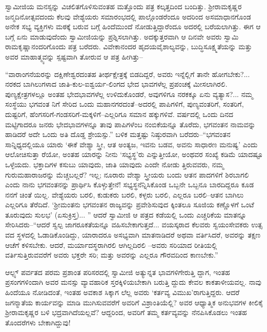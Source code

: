 ಸ್ವಾಮೀಜಿಯ ಮನಸ್ಸನ್ನು ವಿಚಲಿತಗೊಳಿಸುವಂತಹ ಮತ್ತೊಂದು ಪತ್ರ ಕಲ್ಕತ್ತದಿಂದ ಬಂದಿತ್ತು. ಶ್ರೀರಾಮಕೃಷ್ಣರ ಜನ್ಮದಿನೋತ್ಸವದಂದು ಕೆಲವು ವೇಶ್ಯೆಯರು ಸಮಾರಂಭದಲ್ಲಿ ಪಾಲ್ಗೊಂಡರೆಂದೂ ಅದರಿಂದ ಅಸಮಾಧಾನಗೊಂಡ ಅನೇಕ ಸಭ್ಯ ವ್ಯಕ್ತಿಗಳು ಮಠಕ್ಕೆ ಬರುವ ಬಗ್ಗೆ ಹಿಂದೆಮುಂದೆ ನೋಡುತ್ತಿದ್ದಾರೆಂದೂ ಅದರಲ್ಲಿ ಬರೆಯಲಾಗಿತ್ತು. ಈಗ ಆ ಬಗ್ಗೆ ಏನು ಮಾಡುವುದೆಂದು ಸ್ವಾಮೀಜಿಯನ್ನು ಪ್ರಶ್ನಿಸಲಾಗಿತ್ತು. ಅದಕ್ಕುತ್ತರವಾಗಿ ಆ ದಿನವೇ ಅವರು ಸ್ವಾಮಿ ರಾಮಕೃಷ್ಣಾನಂದರಿಗೊಂದು ಪತ್ರ ಬರೆದರು. ವಿವೇಕಾನಂದರ ಹೃದಯವೈಶಾಲ್ಯವನ್ನು, ಬುದ್ಧಿಸೂಕ್ಷ್ಮತೆಯನ್ನು ಮತ್ತು ಅವರ ಮಾಹಾತ್ಮ್ಯವನ್ನು ಸ್ಪಷ್ಟವಾಗಿ ತೋರುವ ಆ ಪತ್ರ ಹೀಗಿತ್ತು–

“ವಾರಾಂಗನೆಯರನ್ನು ದಕ್ಷಿಣೇಶ್ವರದಂತಹ ತೀರ್ಥಕ್ಷೇತ್ರಕ್ಕೆ ಬಿಡದಿದ್ದರೆ, ಅವರು ಇನ್ನೆಲ್ಲಿಗೆ ತಾನೇ ಹೋಗಬೇಕು?... ನರಕದ ಬಾಗಿಲುಗಳಾದ ಜಾತಿ-ಕುಲ-ಐಶ್ವರ್ಯ-ಲಿಂಗದ ಭೇದ ಭಾವಗಳೆಲ್ಲ ಪ್ರಪಂಚಕ್ಕೆ ಮೀಸಲಾಗಿರಲಿ. ಪುಣ್ಯಕ್ಷೇತ್ರಗಳಲ್ಲೂ ಅಂತಹ ಭೇದಭಾವಗಳೆಲ್ಲ ಉಳಿದುಕೊಂಡರೆ, ಅವುಗಳಿಗೂ ನರಕಕ್ಕೂ ಏನು ವ್ಯತ್ಯಾಸ?... ನಮ್ಮ ಸಂಸ್ಥೆಯು ಭಗವಂತ ನಿಗೆ ಸೇರಿದ ಒಂದು ಮಹಾನಗರದಂತೆ–ಅದರಲ್ಲಿ ಪಾಪಿಗಳಿಗೆ, ಪುಣ್ಯವಂತರಿಗೆ, ಸಂತರಿಗೆ, ದುಷ್ಟರಿಗೆ, ಹೆಂಗಸರಿಗೆ-ಗಂಡಸರಿಗೆ-ಮಕ್ಕಳಿಗೆ–ಎಲ್ಲರಿಗೂ ಸಮಾನ ಹಕ್ಕುಗಳಿವೆ. ವರ್ಷದಲ್ಲಿ ಒಂದು ದಿನದ ಮಟ್ಟಿಗಾದರೂ ಜನರು ಭೇದಭಾವಗಳನ್ನೂ ತಾವು ಪಾಪಿಗಳೆಂಬ ನಂಬಿಕೆಯನ್ನೂ ತೊರೆದು, ಭಗವಂತನ ನಾಮವನ್ನು ಹಾಡಿದರೆ ಅದೇ ಒಂದು ಅತಿ ದೊಡ್ಡ ಶ್ರೇಯಸ್ಸು.” ಬಳಿಕ ಮತ್ತಷ್ಟು ನಿಷ್ಠುರವಾಗಿ ಬರೆದರು–“ಭಗವಂತನ ಸಾನ್ನಿಧ್ಯದಲ್ಲಿಯೂ ಯಾರು ‘ಈಕೆ ವೇಶ್ಯಾ ಸ್ತ್ರೀ, ಆತ ಅಂತ್ಯಜ, ಇವನು ಬಡವ, ಅವನು ಸಾಧಾರಣ ಮನುಷ್ಯ’ ಎಂದು ಆಲೋಚಿಸುತ್ತಾ ರೆಯೋ, ಅಂತಹ ಯಾರನ್ನು ನೀನು ‘ಸಭ್ಯಸ್ಥ’ರು ಎನ್ನುತ್ತೀಯೋ, ಅಂಥವರ ಸಂಖ್ಯೆ ಕಡಿಮೆ ಯಾದಷ್ಟೂ ಒಳ್ಳೆಯದು. ಭಕ್ತಾದಿಗಳ ಕಸುಬು ಯಾವುದು, ಜಾತಿ ಯಾವುದು ಎಂದೇ ನೋಡು ತ್ತಿರುವವರು, ನಮ್ಮ ಗುರುಮಹಾರಾಜರನ್ನು ಮೆಚ್ಚಬಲ್ಲರೆ? ಇಲ್ಲ; ನೂರಾರು ವೇಶ್ಯಾ ಸ್ತ್ರೀಯರು ಬಂದು ಆತನ ಪಾದಗಳಿಗೆ ಶಿರಬಾಗಲಿ ಎಂದು ನಾನು ಭಗವಂತನನ್ನು ಪ್ರಾರ್ಥಿಸಿ ಕೊಳ್ಳುತ್ತೇನೆ! ಸಭ್ಯಸ್ಥನೆನ್ನಿಸಿಕೊಂಡ ಒಬ್ಬನೇ ಒಬ್ಬನೂ ಬಾರದಿದ್ದರೂ ಕೂಡ ನನಗೆ ಚಿಂತೆ ಯಿಲ್ಲ. ವೇಶ್ಯೆಯರು ಬರಲಿ, ಕುಡುಕರು ಬರಲಿ, ಕಳ್ಳರು ಬರಲಿ, ಎಲ್ಲರೂ ಬರಲಿ–ಆತನ ಬಾಗಿಲು ಎಲ್ಲರಿಗೂ ತೆರೆದಿದೆ. ‘ಶ್ರೀಮಂತನು ಭಗವಂತನ ರಾಜ್ಯವನ್ನು ಪ್ರವೇಶಿಸುವುದ ಕ್ಕಿಂತಲೂ ಸೂಜಿಯ ಕಣ್ಣೊಳಗೆ ಒಂಟೆ ತೂರುವುದು ಸುಲಭ’ (ಏಸುಕ್ರಿಸ್ತ)... ” ಆದರೆ ಸ್ವಾಮೀಜಿ ಆ ಪತ್ರದ ಕಡೆಯಲ್ಲಿ ಒಂದು ಎಚ್ಚರಿಕೆಯ ಮಾತನ್ನೂ ಸೇರಿಸಿದರು–“ಆದರೆ ಸ್ವಲ್ಪ ಜಾಗರೂಕತೆಯನ್ನೂ ವಹಿಸಬೇಕಾಗುತ್ತದೆ... ವಯಸ್ಕರಾದ ಕೆಲವರು ಸ್ವಯಂಸೇವಕರು ಉತ್ಸ ವದ ಸ್ಥಳದಲ್ಲಿ ಓಡಾಡಿಕೊಂಡಿದ್ದು, ಯಾರಾದರೂ ಅಸಭ್ಯವಾಗಿ ಮಾತನಾಡಿದರೆ ಅಥವಾ ವರ್ತಿಸಿದರೆ, ಅವರನ್ನು ತಕ್ಷಣ ಆಚೆಗೆ ಕಳಿಸಬೇಕು. ಆದರೆ, ಮರ್ಯಾದಸ್ಥರಾಗಿರಲಿ ಆಗಿಲ್ಲದಿರಲಿ –ಅವರು ಸರಿಯಾದ ರೀತಿಯಲ್ಲಿ ವರ್ತಿಸುತ್ತಿರುವವರೆಗೆ ಅವರು ಭಕ್ತರೇ ಸರಿ; ಮತ್ತು ಅವರನ್ನು ಎಲ್ಲರೂ ಗೌರವದಿಂದ ಕಾಣಬೇಕು.”

ಆಲ್ಪ್ಸ್ ಪರ್ವತದ ಪರಮ ಪ್ರಶಾಂತ ಪರಿಸರದಲ್ಲಿ ಸ್ವಾಮೀಜಿ ಅತ್ಯುನ್ನತ ಭಾವಗಳಿಗೇರುತ್ತಿ ದ್ದಾಗ, ಇಂತಹ ಪ್ರಸಂಗಗಳಿಂದಾಗಿ ಅವರ ಮನಸ್ಸು ವ್ಯಾವಹಾರಿಕ ಸ್ತರಕ್ಕಿಳಿಯಬೇಕಾಗಿ ಬರುತ್ತಿ ದ್ದುದು ಕೇವಲ ಕಾಕತಾಳೀಯವಲ್ಲ. ನಾವು ಹಿಂದೆಯೂ ನೋಡಿದಂತೆ, ಇಂತಹ ಅವಕಾಶ ಸಿಕ್ಕಾಗ ಲೆಲ್ಲ ಅವರು ‘ಕರ್ತವ್ಯ ವಿಮುಖ’ರಾಗುತ್ತಿದ್ದರು. ಆದರೆ ಜಗನ್ಮಾತೆಯ ಕಾರ್ಯವನ್ನು ಮಾಡಿ ಮುಗಿಸುವವರೆಗೆ ಅವರಿಗೆ ವಿಶ್ರಾಂತಿಯೆಲ್ಲಿ? ಅವರ ಆಧ್ಯಾತ್ಮಿಕ ಅನುಭವಗಳ ಕೀಲಿಕೈ ಶ್ರೀರಾಮಕೃಷ್ಣರ ಬಳಿ ಭದ್ರವಾಗಿದೆಯಲ್ಲವೆ? ಆದ್ದರಿಂದ, ಅವರಿಗೆ ತಮ್ಮ ಕರ್ತವ್ಯವನ್ನು ನೆನಪಿಸಿಕೊಡಲು ಇಂತಹ ತೊಂದರೆಗಳು ಬೇಕಾಗಿದ್ದುವು!

